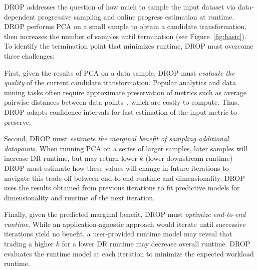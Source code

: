 DROP addresses the question of how much to sample the input dataset via data-dependent progressive sampling and online progress estimation at runtime.  
DROP performs PCA on a small sample to obtain a candidate transformation, then increases the number of samples until termination (see Figure~\ref{fig:basic}). 
To identify the termination point that minimizes runtime, DROP must overcome three challenges:

First, given the results of PCA on a data sample, DROP must \emph{evaluate the quality} of the current candidate transformation.
Popular analytics and data mining tasks often require approximate preservation of metrics such as average pairwise distances between data points~\cite{time-series-dm,dm-book}, which are costly to compute.
Thus, DROP adapts confidence intervals for fast estimation of the input metric to preserve.


Second, DROP must \emph{estimate the marginal benefit of sampling additional datapoints}.
When running PCA on a series of larger samples, later samples will increase DR runtime, but may return lower $k$ (lower downstream runtime)---DROP must estimate how these values will change in future iterations to navigate this trade-off between end-to-end runtime and dimensionality.
DROP uses the results obtained from previous iterations to fit predictive models for dimensionality and runtime of the next iteration.

Finally, given the predicted marginal benefit, DROP must \emph{optimize end-to-end runtime}.
While an application-agnostic approach would iterate until successive iterations yield no benefit, a user-provided runtime model may reveal that trading a higher $k$ for a lower DR runtime may decrease overall runtime.
DROP evaluates the runtime model at each iteration
to minimize the expected workload runtime.


